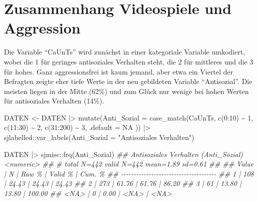 \documentclass[
  10pt,
  letterpaper,
  a4paper, twoside]{scrreprt}
\newenvironment{Shaded}{\begin{snugshade}}{\end{snugshade}}
\newcommand{\AttributeTok}[1]{\textcolor[rgb]{0.40,0.45,0.13}{#1}}
\newcommand{\ConstantTok}[1]{\textcolor[rgb]{0.56,0.35,0.01}{#1}}
\newcommand{\DecValTok}[1]{\textcolor[rgb]{0.68,0.00,0.00}{#1}}
\newcommand{\DocumentationTok}[1]{\textcolor[rgb]{0.37,0.37,0.37}{\textit{#1}}}
\newcommand{\FunctionTok}[1]{\textcolor[rgb]{0.28,0.35,0.67}{#1}}
\newcommand{\NormalTok}[1]{\textcolor[rgb]{0.00,0.23,0.31}{#1}}
\newcommand{\OtherTok}[1]{\textcolor[rgb]{0.00,0.23,0.31}{#1}}
\newcommand{\SpecialCharTok}[1]{\textcolor[rgb]{0.37,0.37,0.37}{#1}}
\newcommand{\StringTok}[1]{\textcolor[rgb]{0.13,0.47,0.30}{#1}}
\begin{document}
\section{Zusammenhang Videospiele und
Aggression}\label{zusammenhang-videospiele-und-aggression}

Die Variable \enquote{CaUnTs} wird zunächst in einer kategoriale
Variable umkodiert, wobei die 1 für geringes antisoziales Verhalten
steht, die 2 für mittleres und die 3 für hohes. Ganz aggressionsfrei ist
kaum jemand, aber etwa ein Viertel der Befragten zeigte eher tiefe Werte
in der neu gebildeten Variable \enquote{Antisozial}. Die meisten liegen
in der Mitte (62\%) und zum Glück nur wenige bei hohen Werten für
antisoziales Verhalten (14\%).

\begin{Shaded}
\begin{Highlighting}[]
\NormalTok{DATEN }\OtherTok{\textless{}{-}}\NormalTok{ DATEN  }\SpecialCharTok{|\textgreater{}}
  \FunctionTok{mutate}\NormalTok{(}\AttributeTok{Anti\_Sozial =} \FunctionTok{case\_match}\NormalTok{(CaUnTs,}
    \FunctionTok{c}\NormalTok{(}\DecValTok{0}\SpecialCharTok{:}\DecValTok{10}\NormalTok{) }\SpecialCharTok{\textasciitilde{}} \DecValTok{1}\NormalTok{,}
    \FunctionTok{c}\NormalTok{(}\DecValTok{11}\SpecialCharTok{:}\DecValTok{30}\NormalTok{) }\SpecialCharTok{\textasciitilde{}} \DecValTok{2}\NormalTok{,}
    \FunctionTok{c}\NormalTok{(}\DecValTok{31}\SpecialCharTok{:}\DecValTok{200}\NormalTok{) }\SpecialCharTok{\textasciitilde{}} \DecValTok{3}\NormalTok{, }
    \AttributeTok{.default =} \ConstantTok{NA}
\NormalTok{  )) }\SpecialCharTok{|\textgreater{}}
\NormalTok{  sjlabelled}\SpecialCharTok{::}\FunctionTok{var\_labels}\NormalTok{(}\AttributeTok{Anti\_Sozial =} \StringTok{"Antisoziales Verhalten"}\NormalTok{)}

\NormalTok{DATEN }\SpecialCharTok{|\textgreater{}}\NormalTok{ sjmisc}\SpecialCharTok{::}\FunctionTok{frq}\NormalTok{(Anti\_Sozial)}
\DocumentationTok{\#\# Antisoziales Verhalten (Anti\_Sozial) \textless{}numeric\textgreater{} }
\DocumentationTok{\#\# \# total N=442 valid N=442 mean=1.89 sd=0.61}
\DocumentationTok{\#\# }
\DocumentationTok{\#\# Value |   N | Raw \% | Valid \% | Cum. \%}
\DocumentationTok{\#\# {-}{-}{-}{-}{-}{-}{-}{-}{-}{-}{-}{-}{-}{-}{-}{-}{-}{-}{-}{-}{-}{-}{-}{-}{-}{-}{-}{-}{-}{-}{-}{-}{-}{-}{-}{-}{-}{-}}
\DocumentationTok{\#\#     1 | 108 | 24.43 |   24.43 |  24.43}
\DocumentationTok{\#\#     2 | 273 | 61.76 |   61.76 |  86.20}
\DocumentationTok{\#\#     3 |  61 | 13.80 |   13.80 | 100.00}
\DocumentationTok{\#\#  \textless{}NA\textgreater{} |   0 |  0.00 |    \textless{}NA\textgreater{} |   \textless{}NA\textgreater{}}
\end{Highlighting}
\end{Shaded}
\end{document}
